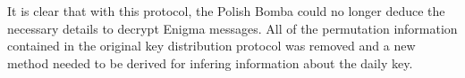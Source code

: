 It is clear that with this protocol, the Polish Bomba could no longer
deduce the necessary
details to decrypt Enigma messages. All of the permutation
information contained in the original key distribution
protocol was removed and a new method needed to be derived for
infering information about the daily key.





